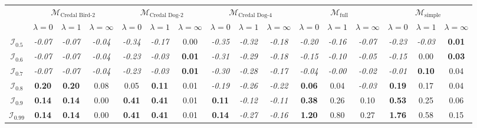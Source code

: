 \begin{tabular}{|c|ccc|ccc|ccc|ccc|ccc|}
\toprule
\hline
 & \multicolumn{3}{c|}{$\mathcal{M}_{\text{Credal Bird-2}}$} & \multicolumn{3}{c|}{$\mathcal{M}_{\text{Credal Dog-2}}$} & \multicolumn{3}{c|}{$\mathcal{M}_{\text{Credal Dog-4}}$} & \multicolumn{3}{c|}{$\mathcal{M}_{\text{full}}$} & \multicolumn{3}{c|}{$\mathcal{M}_{\text{simple}}$} \\
 & $\lambda = 0$ & $\lambda = 1$ & $\lambda = \infty$ & $\lambda = 0$ & $\lambda = 1$ & $\lambda = \infty$ & $\lambda = 0$ & $\lambda = 1$ & $\lambda = \infty$ & $\lambda = 0$ & $\lambda = 1$ & $\lambda = \infty$ & $\lambda = 0$ & $\lambda = 1$ & $\lambda = \infty$ \\
\hline
\midrule
$\mathcal{I}_{0.5}$ & \textit{-0.07} & \textit{-0.07} & \textit{-0.04} & \textit{-0.34} & \textit{-0.17} & 0.00 & \textit{-0.35} & \textit{-0.32} & \textit{-0.18} & \textit{-0.20} & \textit{-0.16} & \textit{-0.07} & \textit{-0.23} & \textit{-0.03} & \textbf{0.01} \\
$\mathcal{I}_{0.6}$ & \textit{-0.07} & \textit{-0.07} & \textit{-0.04} & \textit{-0.23} & \textit{-0.03} & \textbf{0.01} & \textit{-0.31} & \textit{-0.29} & \textit{-0.18} & \textit{-0.15} & \textit{-0.10} & \textit{-0.05} & \textit{-0.15} & 0.00 & \textbf{0.03} \\
$\mathcal{I}_{0.7}$ & \textit{-0.07} & \textit{-0.07} & \textit{-0.04} & \textit{-0.23} & \textit{-0.03} & \textbf{0.01} & \textit{-0.30} & \textit{-0.28} & \textit{-0.17} & \textit{-0.04} & \textit{-0.00} & \textit{-0.02} & \textit{-0.01} & \textbf{0.10} & 0.04 \\
$\mathcal{I}_{0.8}$ & \textbf{0.20} & \textbf{0.20} & 0.08 & 0.05 & \textbf{0.11} & 0.01 & \textit{-0.19} & \textit{-0.26} & \textit{-0.22} & \textbf{0.06} & 0.04 & \textit{-0.03} & \textbf{0.19} & 0.17 & 0.04 \\
$\mathcal{I}_{0.9}$ & \textbf{0.14} & \textbf{0.14} & 0.00 & \textbf{0.41} & \textbf{0.41} & 0.01 & \textbf{0.11} & \textit{-0.12} & \textit{-0.11} & \textbf{0.38} & 0.26 & 0.10 & \textbf{0.53} & 0.25 & 0.06 \\
$\mathcal{I}_{0.99}$ & \textbf{0.14} & \textbf{0.14} & 0.00 & \textbf{0.41} & \textbf{0.41} & 0.01 & \textbf{0.14} & \textit{-0.27} & \textit{-0.16} & \textbf{1.20} & 0.80 & 0.27 & \textbf{1.76} & 0.58 & 0.15 \\
\hline
\bottomrule
\end{tabular}
